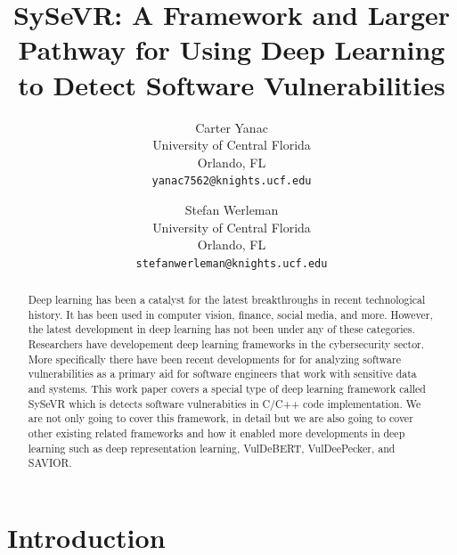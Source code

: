 \documentclass[12pt,twocolumn,letterpaper]{article}
\begin{document}
\title{SySeVR: A Framework and Larger Pathway for Using Deep Learning to Detect Software Vulnerabilities}


\author{
    Carter Yanac\\
    University of Central Florida\\
    Orlando, FL\\
    {\tt\small yanac7562@knights.ucf.edu}
    \and
    Stefan Werleman\\
    University of Central Florida\\
    Orlando, FL\\
    {\tt\small stefanwerleman@knights.ucf.edu}
}
\maketitle

\begin{abstract}
    Deep learning has been a catalyst for the latest breakthroughs in recent technological history. It has been 
    used in computer vision, finance, social media, and more. However, the latest development in deep 
    learning has not been under any of these categories. Researchers have developement deep learning 
    frameworks in the cybersecurity sector. More specifically there have been recent developments for 
    for analyzing software vulnerabilities as a primary aid for software engineers that work with sensitive 
    data and systems. This work paper covers a special type of deep learning framework called SySeVR which is 
    detects software vulnerabities in C/C++ code implementation. We are not only going to cover this framework, 
    in detail but we are also going to cover other existing related frameworks and how it enabled more 
    developments in deep learning such as deep representation learning, VulDeBERT, VulDeePecker, and SAVIOR.
\end{abstract}

\section{Introduction}
\label{sec:intro}
\end{document}
